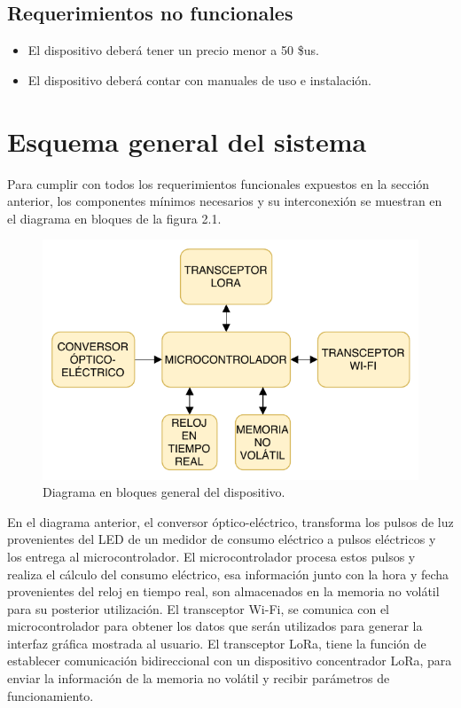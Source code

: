 \subsection{Requerimientos no funcionales}

\begin{itemize}
	\item El dispositivo deberá tener un precio menor a 50 \$us.
	\item El dispositivo deberá contar con manuales de uso e instalación.
\end{itemize}


\section{Esquema general del sistema}

Para cumplir con todos los requerimientos funcionales expuestos en la sección anterior, los componentes mínimos necesarios y su interconexión se muestran en el diagrama en bloques de la figura 2.1.

\begin{figure}[h]
	\centering
	\includegraphics[scale=1]{./Figures/general_blocks.pdf}
	\caption{Diagrama en bloques general del dispositivo.}
	\label{fig:cuadradoAzul}
\end{figure}

En el diagrama anterior, el conversor óptico-eléctrico, transforma los pulsos de luz provenientes del LED de un  medidor de consumo eléctrico a pulsos eléctricos y los entrega al microcontrolador. El microcontrolador procesa estos pulsos y realiza el cálculo del consumo eléctrico, esa información junto con la hora y fecha provenientes del reloj en tiempo real, son almacenados en la memoria no volátil para su posterior utilización. El transceptor Wi-Fi, se comunica con el microcontrolador para obtener los datos que serán utilizados para generar la interfaz gráfica mostrada al usuario. El transceptor LoRa, tiene la función de establecer comunicación bidireccional con un dispositivo concentrador LoRa, para enviar la información de la memoria no volátil y recibir parámetros de funcionamiento.

